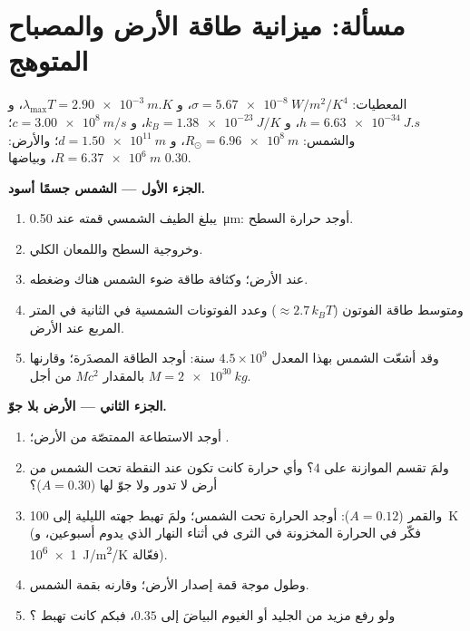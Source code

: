 \section{مسألة: ميزانية طاقة الأرض والمصباح المتوهج}

\begin{problem}\label{pb:b2:thermal-radiation:1}
المعطيات: $\sigma = \qty{5.67e-8}{W/m^2/K^4}$، و $\lambda_{\max}T = \qty{2.90e-3}{m.K}$،
و $h = \qty{6.63e-34}{J.s}$، و $k_B = \qty{1.38e-23}{J/K}$، و $c = \qty{3.00e8}{m/s}$؛
والشمس: $R_\odot = \qty{6.96e8}{m}$، و $d = \qty{1.50e11}{m}$؛ والأرض: $R =
\qty{6.37e6}{m}$، وبياضها $0.30$.

\textbf{الجزء الأول --- الشمس جسمًا أسود.}
\begin{enumerate}
  \item يبلغ الطيف الشمسي قمته عند \qty{0.50}{\micro m}: أوجد حرارة
        السطح.
  \item وخروجية السطح واللمعان الكلي.
  \item {} عند الأرض؛ وكثافة طاقة ضوء الشمس هناك
        وضغطه.
  \item ومتوسط طاقة الفوتون ($\approx 2.7\,k_BT$) وعدد الفوتونات
        الشمسية في الثانية في المتر المربع عند الأرض.
  \item وقد أشعّت الشمس بهذا المعدل $4.5 \times 10^9$ سنة:
        أوجد الطاقة المصدَرة؛ وقارنها بالمقدار $Mc^2$ من أجل $M = \qty{2e30}{kg}$.
\end{enumerate}

\textbf{الجزء الثاني --- الأرض بلا جوّ.}
\begin{enumerate}[resume]
  \item أوجد الاستطاعة الممتصّة من الأرض؛ .
  \item ولمَ تقسم الموازنة على $4$؟ وأي حرارة كانت تكون
        عند النقطة تحت الشمس من أرض لا تدور ولا جوّ لها
        ($A = 0.30$)؟
  \item والقمر ($A = 0.12$): أوجد الحرارة تحت الشمس؛ ولمَ تهبط جهته
        الليلية إلى \qty{100}{K} (فكّر في الحرارة المخزونة في
        الثرى في أثناء النهار الذي يدوم أسبوعين، و \qty{1e6}{J/m^2/K} فعّالة).
  \item وطول موجة قمة إصدار الأرض؛ وقارنه بقمة
        الشمس.
  \item ولو رفع مزيد من الجليد أو الغيوم البياضَ إلى $0.35$، فبكم
        كانت تهبط ؟
\end{enumerate}


\end{problem}
